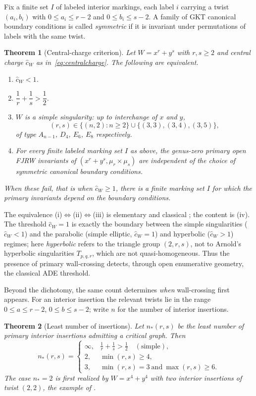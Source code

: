 \documentclass[11pt]{amsart}
\newtheorem{theorem}{Theorem}[section]
\theoremstyle{definition}
\theoremstyle{remark}
\newcommand{\chat}{\hat{c}}
\begin{document}
Fix a finite set $I$ of labeled interior markings, each label $i$ carrying a
twist $(a_i,b_i)$ with $0\le a_i\le r-2$ and $0\le b_i\le s-2$.  A family of
GKT canonical boundary conditions is called \emph{symmetric} if it is invariant
under permutations of labels with the same twist.

\begin{theorem}[Central-charge criterion]
\label{thm:main}
Let $W=x^{r}+y^{s}$ with $r,s\geq2$ and central charge $\chat_{W}$ as
in~\eqref{eq:centralcharge}. The following are equivalent.
\begin{enumerate}
\item[(i)] $\chat_{W}<1$.
\item[(ii)] $\dfrac1r+\dfrac1s>\dfrac12$.
\item[(iii)] $W$ is a simple singularity: up to interchange of $x$ and $y$,
\[
(r,s)\in\{(n,2):n\geq2\}\cup\{(3,3),(3,4),(3,5)\},
\]
of type $A_{n-1}$, $D_{4}$, $E_{6}$, $E_{8}$ respectively.
\item[(iv)] For every finite labeled marking set $I$ as above, the genus-zero primary
open FJRW invariants of $(x^{r}+y^{s},\mu_{r}\times\mu_{s})$ are independent of
the choice of symmetric canonical boundary conditions.
\end{enumerate}
When these fail, that is when $\chat_{W}\geq1$, there is a finite marking set
$I$ for which the primary invariants depend on the boundary conditions.
\end{theorem}

The equivalence (i)$\Leftrightarrow$(ii)$\Leftrightarrow$(iii) is elementary and
classical \cite{Arnold72,Saito74}; the content is (iv). The threshold
$\chat_{W}=1$ is exactly the boundary between the simple singularities
($\chat_{W}<1$) and the parabolic (simple elliptic, $\chat_{W}=1$) and
hyperbolic ($\chat_{W}>1$) regimes; here \emph{hyperbolic} refers to the
triangle group $(2,r,s)$, not to Arnold's hyperbolic singularities
$T_{p,q,r}$, which are not quasi-homogeneous. Thus the presence of primary
wall-crossing detects, through open enumerative geometry, the classical ADE
threshold.

Beyond the dichotomy, the same count determines \emph{when} wall-crossing first
appears. For an interior insertion the relevant twists lie in the range
$0\leq a\leq r-2$, $0\leq b\leq s-2$; write $n$ for the number of interior
insertions.

\begin{theorem}[Least number of insertions]
\label{thm:firstwall}
Let $n_{*}(r,s)$ be the least number of primary interior insertions admitting a
critical graph. Then
\[
n_{*}(r,s)=
\begin{cases}
\infty, & \tfrac1r+\tfrac1s>\tfrac12\quad(\text{simple}),\\[2pt]
2, & \min(r,s)\geq 4,\\[2pt]
3, & \min(r,s)=3\ \text{and}\ \max(r,s)\geq 6.
\end{cases}
\]
The case $n_{*}=2$ is first realized by $W=x^{4}+y^{4}$ with two interior
insertions of twist $(2,2)$, the example of
\cite[Examples~4.9 and~5.5]{GKTsurvey}.
\end{theorem}
\end{document}
